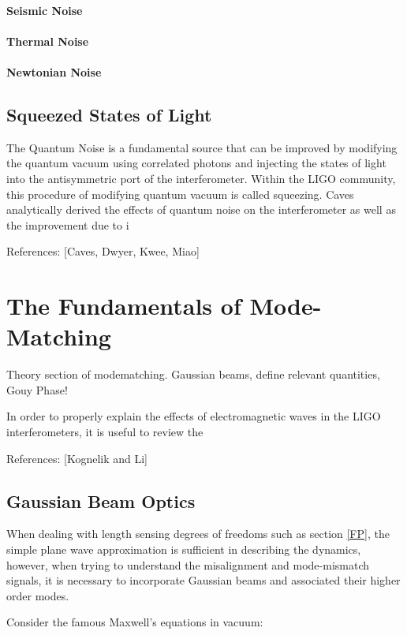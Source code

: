\documentclass[oneside]{book}
\begin{document}
		\subsubsection{Seismic Noise}
		\subsubsection{Thermal Noise}
		\subsubsection{Newtonian Noise}

	
	
	\section{Squeezed States of Light}
	The Quantum Noise is a fundamental source that can be improved by modifying the quantum vacuum using correlated photons and injecting the states of light into the antisymmetric port of the interferometer.  Within the LIGO community, this procedure of modifying quantum vacuum is called squeezing. Caves analytically derived the effects of quantum noise on the interferometer as well as the improvement due to i
	
	References: [Caves, Dwyer, Kwee, Miao]
		
\chapter{The Fundamentals of Mode-Matching}
	Theory section of modematching. Gaussian beams, define relevant quantities, Gouy Phase!
	
	In order to properly explain the effects of electromagnetic waves in the LIGO interferometers, it is useful to review the  
	
	References: [Kognelik and Li]
	
		\section{Gaussian Beam Optics}
		When dealing with length sensing degrees of freedoms such as section \ref{FP}, the simple plane wave approximation is sufficient in describing the dynamics, however, when trying to understand the misalignment and mode-mismatch signals, it is necessary to incorporate Gaussian beams and associated their higher order modes.

		
		Consider the famous Maxwell's equations in vacuum:
		
\end{document}
